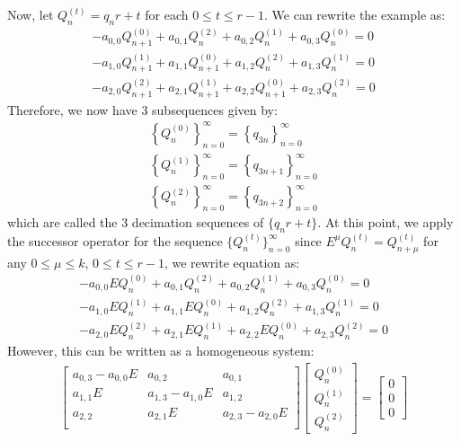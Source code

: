 \documentclass[a4paper]{article}
\theoremstyle{definition}
\begin{document}
Now, let $Q_n^{(t)}=q_nr+t$ for each $0 \le t \le r-1$. We can rewrite the example as:
\begin{align*}
-a_{0,0}Q_{n+1}^{(0)}+a_{0,1}Q_{n}^{(2)}
+a_{0,2}Q_{n}^{(1)}+a_{0,3}Q_{n}^{(0)} = 0 \\
-a_{1,0}Q_{n+1}^{(1)}+a_{1,1}Q_{n+1}^{(0)}
+a_{1,2}Q_{n}^{(2)}+a_{1,3}Q_{n}^{(1)} = 0 \\
-a_{2,0}Q_{n+1}^{(2)}+a_{2,1}Q_{n+1}^{(1)}
+a_{2,2}Q_{n+1}^{(0)}+a_{2,3}Q_{n}^{(2)} = 0
\end{align*}
Therefore, we now have 3 subsequences given by:
\begin{align*}
\left\{Q_n^{(0)}\right\}_{n=0}^{\infty}
=\left\{q_{3n}\right\}_{n=0}^{\infty}   \\
\left\{Q_n^{(1)}\right\}_{n=0}^{\infty}
=\left\{q_{3n+1}\right\}_{n=0}^{\infty} \\
\left\{Q_n^{(2)}\right\}_{n=0}^{\infty}
=\left\{q_{3n+2}\right\}_{n=0}^{\infty}
\end{align*}
which are called the $3$ decimation sequences of $\{q_nr+t\}$. At this point, we apply the successor operator for the sequence $\{Q_n^{(t)}\}_{n=0}^{\infty}$ since $E^{\mu}Q_{n}^{(t)}=Q_{n+\mu}^{(t)}$ for any $0 \le \mu \le k$, $0 \le t \le r-1$, we rewrite equation as:
\begin{align*}
-a_{0,0}EQ_{n}^{(0)}+a_{0,1}Q_{n}^{(2)}
+a_{0,2}Q_{n}^{(1)}+a_{0,3}Q_{n}^{(0)} = 0 \\
-a_{1,0}EQ_{n}^{(1)}+a_{1,1}EQ_{n}^{(0)}
+a_{1,2}Q_{n}^{(2)}+a_{1,3}Q_{n}^{(1)} = 0 \\
-a_{2,0}EQ_{n}^{(2)}+a_{2,1}EQ_{n}^{(1)}
+a_{2,2}EQ_{n}^{(0)}+a_{2,3}Q_{n}^{(2)} = 0
\end{align*}
However, this can be written as a homogeneous system:
\begin{align*}
\begin{bmatrix}
    a_{0,3}-a_{0,0}E & a_{0,2}          & a_{0,1}          \\
    a_{1,1}E         & a_{1,3}-a_{1,0}E & a_{1,2}          \\
    a_{2,2}          & a_{2,1}E         & a_{2,3}-a_{2,0}E \\
\end{bmatrix}
\begin{bmatrix}
    Q_{n}^{(0)} \\
    Q_{n}^{(1)} \\
    Q_{n}^{(2)}
\end{bmatrix}
=
\begin{bmatrix}
    0 \\
    0 \\
    0
\end{bmatrix}
\end{align*}
\end{document}
